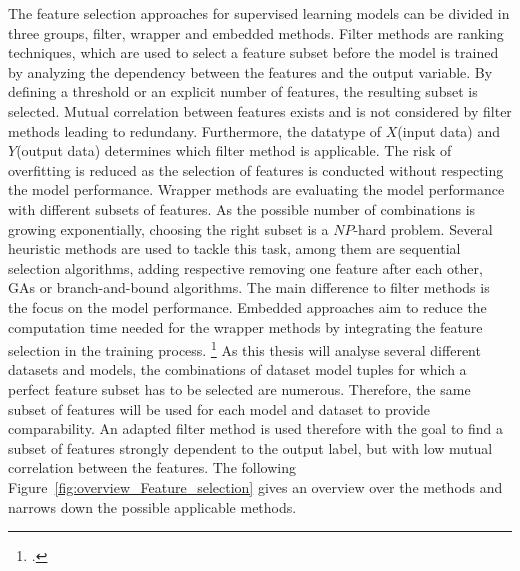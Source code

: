 The feature selection approaches for supervised learning models can be divided in three groups, filter, wrapper and embedded methods.
Filter methods are ranking techniques, which are used to select a feature subset before the model is trained by analyzing
the dependency between the features and the output variable. By defining a threshold or an explicit number of features, the
resulting subset is selected. Mutual correlation between features exists and is not considered by filter methods
leading to redundany. Furthermore, the datatype of $X$(input data) and $Y$(output data) determines which filter method is applicable. The risk
of overfitting is reduced as the selection of features is conducted without respecting the model performance.
Wrapper methods are evaluating the model performance with different subsets of features. As the possible number of combinations is growing
exponentially, choosing the right subset is a $NP$-hard problem. Several heuristic methods are used to tackle this task, among them
are sequential selection algorithms, adding respective removing one feature after each other,
\glspl{GA} or branch-and-bound algorithms. The main difference to filter methods is the focus on the model performance.
Embedded approaches aim to reduce the computation time needed for the wrapper methods by integrating the
feature selection in the training process. \footcites[cf.][pp. 17--21]{chandrashekar_survey_2014} As this thesis will analyse several
different datasets and models, the combinations of dataset model tuples for which a perfect feature subset
has to be selected are numerous. Therefore, the same subset of features will be used for each model and dataset to provide comparability.
An adapted filter method is used therefore with the goal to find a subset of features strongly dependent
to the output label, but with low mutual correlation between the features. The following Figure~\ref{fig:overview_Feature_selection}
gives an overview over the methods and narrows down the possible applicable methods.



